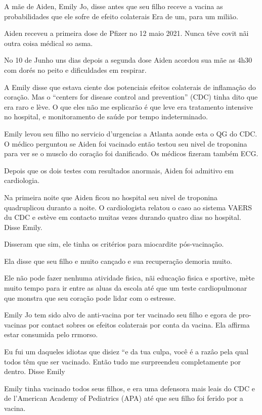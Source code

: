 A mãe de Aiden, Emily Jo, disse antes que seu filho receve a vacina as
probabilidades que ele sofre de efeito colaterais Era de um, para um milião.

Aiden receveu a primeira dose de Pfizer no 12 maio 2021. Nunca têve covit nãi
outra coisa médical so asma.

No 10 de Junho uns dias depois a segunda dose Aiden acordou sua mãe as 4h30 com
dorés no peito e dificuldades em respirar.

A Emily disse que estava ciente dos potenciais efeitos colaterais de inflamação
do coração. Mas o ``centers for disease control and prevention'' (CDC) tinha
dito que era raro e lève. O que eles não me esplicarão é que leve era tratamento
intensive no hospital, e monitoramento de saúde por tempo indeterminado.

Emily levou seu filho no servicio d'urgencias a Atlanta aonde esta o QG do
CDC. O médico perguntou se Aiden foi vacinado então testou seu nivel de
troponina para ver se o musclo do coração foi danificado. Os médicos fizeram
também ECG.

Depois que os dois testes com resultados anormais, Aiden foi admitivo em
cardiologia.

Na primeira noite que Aiden ficou no hospital seu nivel de troponina
quadruplicou duranto a noite. O cardiologista relatou o caso ao sistema VAERS du
CDC e estève em contacto muitas vezes durando quatro dias no hospital. Disse
Emily.

Disseram que sim, ele tinha os critérios para miocardite pós-vacinação.

Ela disse que seu filho e muito cançado e sua recuperação demoria muito.

Ele não pode fazer nenhuma atividade fisica, nãi educação fisica e sportive,
mète muito tempo para ir entre as aluas da escola até que um teste
cardiopulmonar que monstra que seu coração pode lidar com o estresse.

Emily Jo tem sido alvo de anti-vacina por ter vacinado seu filho e egora de
pro-vacinas por contact sobres os efeitos colaterais por conta da vacina. Ela
affirma estar consumida pelo rrmorso.

Eu fui um daqueles idiotas que disiez ``e da tua culpa, você é a razâo pela qual
todos têm que ser vacinado. Então tudo me surpreendeu completamente por
dentro. Disse Emily

Emily tinha vacinado todos seus filhos, e era uma defensora mais leais do CDC e
de l'American Academy of Pediatrics (APA) até que seu filho foi ferido por a
vacina.

